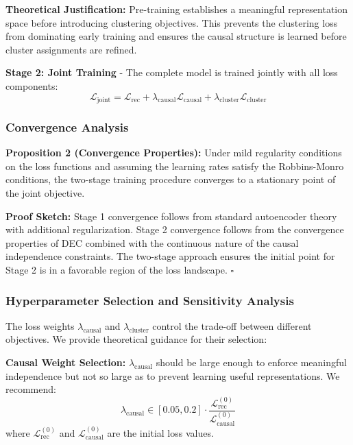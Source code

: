 \documentclass[journal]{IEEEtran}
\begin{document}
\textbf{Theoretical Justification:} Pre-training establishes a meaningful representation space before introducing clustering objectives. This prevents the clustering loss from dominating early training and ensures the causal structure is learned before cluster assignments are refined.

\textbf{Stage 2: Joint Training} - The complete model is trained jointly with all loss components:
\begin{equation}
\mathcal{L}_{\text{joint}} = \mathcal{L}_{\text{rec}} + \lambda_{\text{causal}} \mathcal{L}_{\text{causal}} + \lambda_{\text{cluster}} \mathcal{L}_{\text{cluster}}
\label{eq:joint_loss}
\end{equation}

\subsubsection{Convergence Analysis}

\textbf{Proposition 2 (Convergence Properties):} Under mild regularity conditions on the loss functions and assuming the learning rates satisfy the Robbins-Monro conditions, the two-stage training procedure converges to a stationary point of the joint objective.

\textbf{Proof Sketch:} Stage 1 convergence follows from standard autoencoder theory with additional regularization. Stage 2 convergence follows from the convergence properties of DEC combined with the continuous nature of the causal independence constraints. The two-stage approach ensures the initial point for Stage 2 is in a favorable region of the loss landscape. $\square$

\subsubsection{Hyperparameter Selection and Sensitivity Analysis}

The loss weights $\lambda_{\text{causal}}$ and $\lambda_{\text{cluster}}$ control the trade-off between different objectives. We provide theoretical guidance for their selection:

\textbf{Causal Weight Selection:} $\lambda_{\text{causal}}$ should be large enough to enforce meaningful independence but not so large as to prevent learning useful representations. We recommend:
\begin{equation}
\lambda_{\text{causal}} \in [0.05, 0.2] \cdot \frac{\mathcal{L}_{\text{rec}}^{(0)}}{\mathcal{L}_{\text{causal}}^{(0)}}
\label{eq:causal_weight_selection}
\end{equation}
where $\mathcal{L}_{\text{rec}}^{(0)}$ and $\mathcal{L}_{\text{causal}}^{(0)}$ are the initial loss values.
\end{document}
